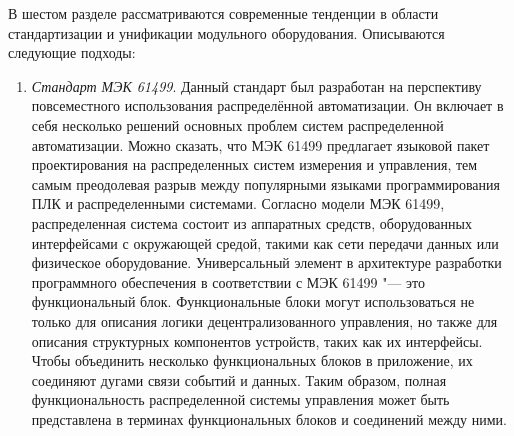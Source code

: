 В шестом разделе рассматриваются современные тенденции в области стандартизации и унификации модульного оборудования. Описываются следующие подходы:

\begin{enumerate}
	\item\textit{Стандарт МЭК 61499}. Данный стандарт был разработан на перспективу повсеместного использования распределённой автоматизации. Он включает в себя несколько решений основных проблем систем распределенной автоматизации. Можно сказать, что МЭК 61499 предлагает языковой пакет проектирования на распределенных систем измерения и управления, тем самым преодолевая разрыв между популярными языками программирования ПЛК и распределенными системами. Согласно модели МЭК 61499, распределенная система состоит из аппаратных средств, оборудованных интерфейсами с окружающей средой, такими как сети передачи данных или физическое оборудование. Универсальный элемент в архитектуре разработки программного обеспечения в соответствии с МЭК 61499 "--- это функциональный блок. Функциональные блоки могут использоваться не только для описания логики децентрализованного управления, но также для описания структурных компонентов устройств, таких как их интерфейсы. Чтобы объединить несколько функциональных блоков в приложение, их соединяют дугами связи событий и данных. Таким образом, полная функциональность распределенной системы управления может быть представлена ​​в терминах функциональных блоков и соединений между ними.

\end{enumerate}
